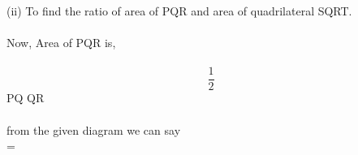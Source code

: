 \documentclass[a4paper,12pt,two column]{article}
\begin{document}
(ii) To find the ratio of area of \triangle PQR \hspace{0.1cm} and \hspace{0.1cm} area \hspace{0.1cm} of \hspace{0.1cm} quadrilateral \hspace{0.1cm} SQRT.\\\\
Now,
Area\hspace{0.2cm} of\hspace{0.2cm} \triangle PQR \hspace{0.2cm} is,\\\\ 
\implies
\[\frac{1}{2}\] \hspace{0.2cm} \times \hspace{0.2cm} PQ \hspace{0.2cm} \times \hspace{0.2cm} QR\\\\
from \hspace{0.2cm}the\hspace{0.2cm} given\hspace{0.2cm} diagram \hspace{0.2cm}we \hspace{0.2cm}can\hspace{0.2cm} say \hspace{0.2cm}\\
 = \\
\end{document}
